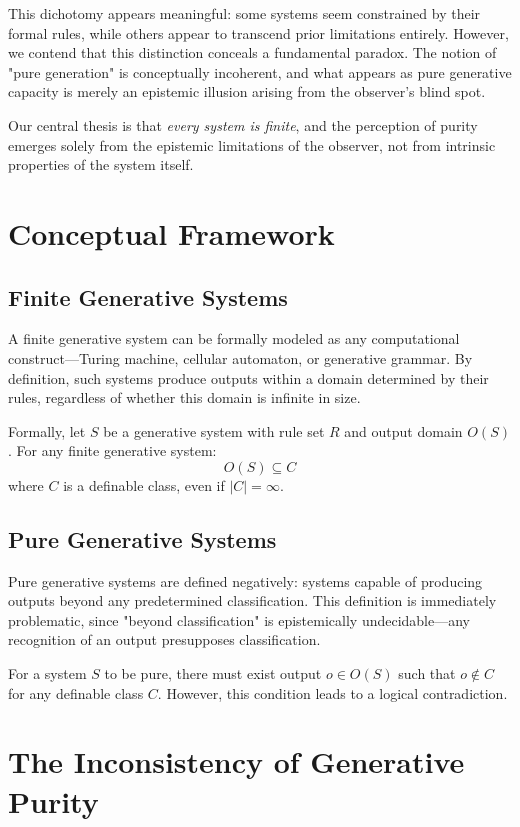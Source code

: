 \documentclass[11pt,a4paper]{article}
\begin{document}
    This dichotomy appears meaningful: some systems seem constrained by their formal rules, while others appear to transcend prior limitations entirely. However, we contend that this distinction conceals a fundamental paradox. The notion of "pure generation" is conceptually incoherent, and what appears as pure generative capacity is merely an epistemic illusion arising from the observer's blind spot.

    Our central thesis is that \textit{every system is finite}, and the perception of purity emerges solely from the epistemic limitations of the observer, not from intrinsic properties of the system itself.

    \section{Conceptual Framework}

    \subsection{Finite Generative Systems}

    A finite generative system can be formally modeled as any computational construct—Turing machine, cellular automaton, or generative grammar. By definition, such systems produce outputs within a domain determined by their rules, regardless of whether this domain is infinite in size.

    Formally, let $S$ be a generative system with rule set $R$ and output domain $O(S)$. For any finite generative system:
    $$O(S) \subseteq C$$
    where $C$ is a definable class, even if $|C| = \infty$.

    \subsection{Pure Generative Systems}

    Pure generative systems are defined negatively: systems capable of producing outputs beyond any predetermined classification. This definition is immediately problematic, since "beyond classification" is epistemically undecidable—any recognition of an output presupposes classification.

    For a system $S$ to be pure, there must exist output $o \in O(S)$ such that $o \notin C$ for any definable class $C$. However, this condition leads to a logical contradiction.

    \section{The Inconsistency of Generative Purity}
\end{document}
